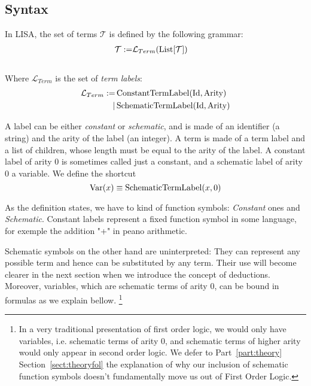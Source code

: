 \subsection{Syntax}
\begin{defin}[Terms]
In LISA, the set of terms $\mathcal{T}$ is defined by the following grammar:
\begin{equation}
\begin{split}
\mathcal{T} := & \mathcal{L}_{Term}(\operatorname{List}[\mathcal{T}])
\end{split}
\end{equation}\\
Where $\mathcal{L}_{Term}$ is the set of \textit{term labels}:
\begin{equation}
\begin{split}
\mathcal{L}_{Term} := & \operatorname{ConstantTermLabel}(\textnormal{Id}, \textnormal{Arity})\\
              \mid & \operatorname{SchematicTermLabel}(\textnormal{Id}, \textnormal{Arity})
\end{split}
\end{equation}

A label can be either \textit{constant} or \textit{schematic}, and is made of an identifier (a string) and the arity of the label (an integer). 
A term is made of a term label and a list of children, whose length must be equal to the arity of the label.
A constant label of arity $0$ is sometimes called just a constant, and a schematic label of arity $0$ a variable. We define the shortcut $$\operatorname{Var}(x) \equiv \operatorname{SchematicTermLabel}(x, 0)$$
\end{defin}

As the definition states, we have to kind of function symbols: \textit{Constant} ones and \textit{Schematic}. Constant labels represent a fixed function symbol in some language, for exemple the addition "+" in peano arithmetic.

Schematic symbols on the other hand are uninterpreted: They can represent any possible term and hence can be substituted by any term. Their use will become clearer in the next section when we introduce the concept of deductions.  Moreover, variables, which are schematic terms of arity 0, can be bound in formulas as we explain bellow. \footnote{In a very traditional presentation of first order logic, we would only have variables, i.e. schematic terms of arity 0, and schematic terms of higher arity would only appear in second order logic. We defer to Part~\ref{part:theory} Section~\ref{sect:theoryfol} the explanation of why our inclusion of schematic function symbols doesn't fundamentally move us out of First Order Logic.}

